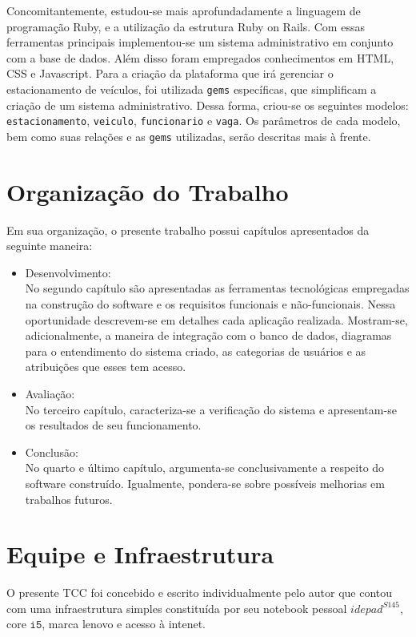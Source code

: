 Concomitantemente, estudou-se mais aprofundadamente a linguagem de programação Ruby, e a utilização da estrutura Ruby on Rails. Com essas ferramentas principais  implementou-se um sistema administrativo em conjunto com a base de dados. Além disso foram empregados
conhecimentos em HTML, CSS e Javascript. 
Para a criação da plataforma que irá gerenciar o estacionamento de veículos, foi utilizada \texttt{gems} específicas, que simplificam a criação de um sistema administrativo. Dessa forma, criou-se  os seguintes modelos: \texttt{estacionamento}, \texttt{veiculo}, \texttt{funcionario} e \texttt{vaga}. Os parâmetros de cada modelo, bem como suas relações e as \texttt{gems} utilizadas, serão descritas mais à frente.

\section{Organização do Trabalho}
Em sua organização, o presente trabalho possui capítulos apresentados da seguinte maneira:
\begin{itemize}
	\item Desenvolvimento:\\
	No segundo capítulo são apresentadas as ferramentas tecnológicas empregadas na construção do software e os requisitos funcionais e não-funcionais. Nessa oportunidade descrevem-se em  detalhes cada aplicação realizada. Mostram-se, adicionalmente, a maneira de integração com o banco de dados, diagramas para o entendimento do sistema criado, as categorias de usuários e as atribuições que esses tem acesso.  
	\item Avaliação:\\
	No terceiro capítulo, caracteriza-se a verificação do sistema e apresentam-se os resultados de seu funcionamento. 
	\item Conclusão:\\
	No quarto e último capítulo, argumenta-se conclusivamente a respeito do software construído. Igualmente, pondera-se sobre possíveis melhorias em trabalhos futuros.
\end{itemize}

\section{Equipe e Infraestrutura}

O presente TCC foi concebido e escrito individualmente pelo autor que contou com uma infraestrutura simples constituída por seu notebook pessoal $idepad^{S145}$, core $\texttt{i5}$, marca lenovo e acesso à intenet.



